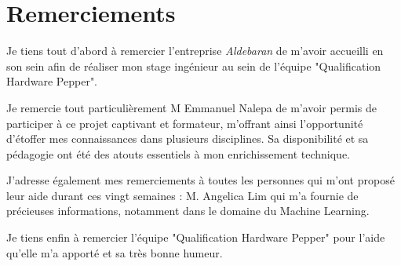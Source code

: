 \chapter*{Remerciements}
\thispagestyle{fancy}
\label{Remerciements}

Je tiens tout d'abord à remercier l'entreprise \emph{Aldebaran} de m'avoir accueilli en son sein afin de réaliser mon stage ingénieur au sein de l'équipe "Qualification Hardware Pepper".

Je remercie tout particulièrement M Emmanuel Nalepa de m'avoir permis de participer à ce projet captivant et formateur, m'offrant ainsi l'opportunité d'étoffer mes connaissances dans plusieurs disciplines. Sa disponibilité et sa pédagogie ont été des atouts essentiels à mon enrichissement technique.

J’adresse également mes remerciements à toutes les personnes qui m’ont proposé leur aide durant ces vingt semaines :
M. Angelica Lim qui m’a fournie de précieuses informations, notamment dans le domaine du Machine Learning.

Je tiens enfin à remercier l'équipe "Qualification Hardware Pepper" pour l'aide qu'elle m'a apporté et sa très bonne humeur.

